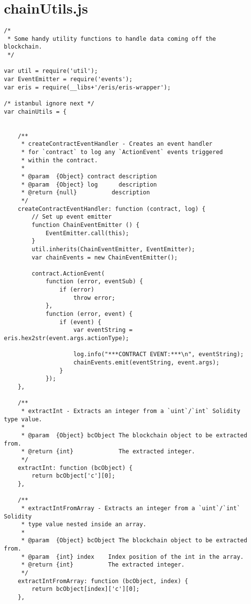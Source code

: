 \section{chainUtils.js}
\lstset{language=java}
\begin{lstlisting}
/*
 * Some handy utility functions to handle data coming off the blockchain.
 */

var util = require('util');
var EventEmitter = require('events');
var eris = require(__libs+'/eris/eris-wrapper');

/* istanbul ignore next */
var chainUtils = {


    /**
     * createContractEventHandler - Creates an event handler
     * for `contract` to log any `ActionEvent` events triggered
     * within the contract.
     *
     * @param  {Object} contract description
     * @param  {Object} log      description
     * @return {null}          description
     */
    createContractEventHandler: function (contract, log) {
        // Set up event emitter
        function ChainEventEmitter () {
            EventEmitter.call(this);
        }
        util.inherits(ChainEventEmitter, EventEmitter);
        var chainEvents = new ChainEventEmitter();

        contract.ActionEvent(
            function (error, eventSub) {
                if (error)
                    throw error;
            },
            function (error, event) {
                if (event) {
                    var eventString = eris.hex2str(event.args.actionType);

                    log.info("***CONTRACT EVENT:***\n", eventString);
                    chainEvents.emit(eventString, event.args);
                }
            });
    },

    /**
     * extractInt - Extracts an integer from a `uint`/`int` Solidity type value.
     *
     * @param  {Object} bcObject The blockchain object to be extracted from.
     * @return {int}             The extracted integer.
     */
    extractInt: function (bcObject) {
        return bcObject['c'][0];
    },

    /**
     * extractIntFromArray - Extracts an integer from a `uint`/`int` Solidity
     * type value nested inside an array.
     *
     * @param  {Object} bcObject The blockchain object to be extracted from.
     * @param  {int} index    Index position of the int in the array.
     * @return {int}          The extracted integer.
     */
    extractIntFromArray: function (bcObject, index) {
        return bcObject[index]['c'][0];
    },


\end{lstlisting}
